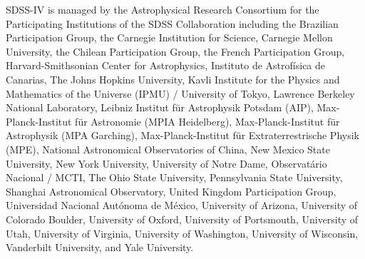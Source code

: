 \documentclass[modern]{aastex62}
\begin{document}
SDSS-IV is managed by the Astrophysical Research Consortium for the
Participating Institutions of the SDSS Collaboration including the Brazilian
Participation Group, the Carnegie Institution for Science, Carnegie Mellon
University, the Chilean Participation Group, the French Participation Group,
Harvard-Smithsonian Center for Astrophysics, Instituto de Astrof\'isica de
Canarias, The Johns Hopkins University, Kavli Institute for the Physics and
Mathematics of the Universe (IPMU) / University of Tokyo, Lawrence Berkeley
National Laboratory, Leibniz Institut f\"ur Astrophysik Potsdam (AIP),
Max-Planck-Institut f\"ur Astronomie (MPIA Heidelberg), Max-Planck-Institut
f\"ur Astrophysik (MPA Garching), Max-Planck-Institut f\"ur Extraterrestrische
Physik (MPE), National Astronomical Observatories of China, New Mexico State
University, New York University, University of Notre Dame, Observat\'ario
Nacional / MCTI, The Ohio State University, Pennsylvania State University,
Shanghai Astronomical Observatory, United Kingdom Participation Group,
Universidad Nacional Aut\'onoma de M\'exico, University of Arizona, University
of Colorado Boulder, University of Oxford, University of Portsmouth, University
of Utah, University of Virginia, University of Washington, University of
Wisconsin, Vanderbilt University, and Yale University.





\end{document}
